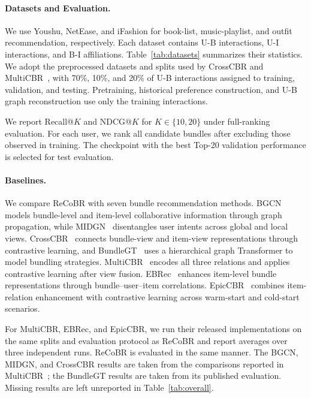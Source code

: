 \documentclass[letterpaper]{article}
\begin{document}
\paragraph{Datasets and Evaluation.}
We use Youshu, NetEase, and iFashion for book-list, music-playlist,
and outfit recommendation, respectively. Each dataset contains
U-B interactions, U-I interactions, and B-I affiliations.
Table~\ref{tab:datasets} summarizes their statistics. We adopt
the preprocessed datasets and splits used by CrossCBR and
MultiCBR~\cite{ma2022crosscbr,ma2024multicbr}, with 70\%, 10\%, and
20\% of U-B interactions assigned to training, validation, and
testing. Pretraining, historical preference construction, and
U-B graph reconstruction use only the training interactions.

We report Recall@$K$ and NDCG@$K$ for $K\in\{10,20\}$ under
full-ranking evaluation. For each user, we rank all candidate
bundles after excluding those observed in training. The
checkpoint with the best Top-20 validation performance is
selected for test evaluation.

\paragraph{Baselines.}
We compare ReCoBR with seven bundle recommendation methods.
BGCN~\cite{chang2020bgcn} models bundle-level and item-level collaborative
information through graph propagation, while MIDGN~\cite{zhao2022midgn}
disentangles user intents across global and local views.
CrossCBR~\cite{ma2022crosscbr} connects bundle-view and item-view
representations through contrastive learning, and
BundleGT~\cite{wei2023bundlegt} uses a hierarchical graph Transformer
to model bundling strategies. MultiCBR~\cite{ma2024multicbr}
encodes all three relations and applies contrastive learning
after view fusion. EBRec~\cite{du2025ebrec} enhances item-level bundle
representations through bundle--user--item correlations.
EpicCBR~\cite{li2026epiccbr} combines item-relation enhancement with
contrastive learning across warm-start and cold-start scenarios.

For MultiCBR, EBRec, and EpicCBR, we run their released
implementations on the same splits and evaluation protocol as
ReCoBR and report averages over three independent runs. ReCoBR is
evaluated in the same manner. The BGCN, MIDGN, and CrossCBR
results are taken from the comparisons reported in
MultiCBR~\cite{ma2024multicbr}; the BundleGT results are taken
from its published evaluation. Missing results are left
unreported in Table~\ref{tab:overall}.
\end{document}

